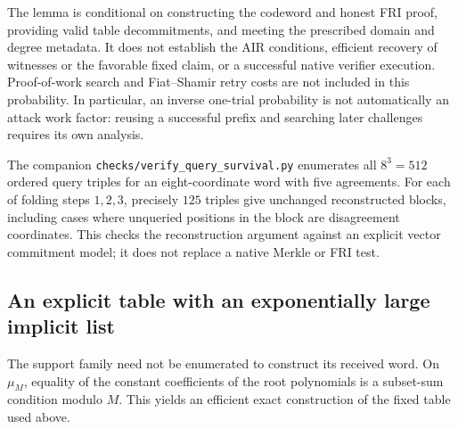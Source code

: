 \documentclass[11pt,letterpaper]{article}
\theoremstyle{definition}
\theoremstyle{remark}
\begin{document}
The lemma is conditional on constructing the codeword and honest FRI
proof, providing valid table decommitments, and meeting the prescribed
domain and degree metadata. It does not establish the AIR conditions,
efficient recovery of witnesses or the favorable fixed claim, or a successful
native verifier execution. Proof-of-work search and Fiat--Shamir retry
costs are not included in this probability. In particular, an inverse
one-trial probability is not automatically an attack work factor:
reusing a successful prefix and searching later challenges requires its
own analysis.

The companion \texttt{checks/verify\_query\_survival.py} enumerates all
$8^3=512$ ordered query triples for an eight-coordinate word with five
agreements. For each of folding steps $1,2,3$, precisely $125$ triples
give unchanged reconstructed blocks, including cases where unqueried
positions in the block are disagreement coordinates. This checks the
reconstruction argument against an explicit vector commitment model;
it does not replace a native Merkle or FRI test.


\subsection{An explicit table with an exponentially large implicit list}
\label{sec:implicit-bank}

The support family need not be enumerated to construct its received
word. On $\mu_M$, equality of the constant coefficients of the root
polynomials is a subset-sum condition modulo $M$. This yields an
efficient exact construction of the fixed table used above.
\end{document}
